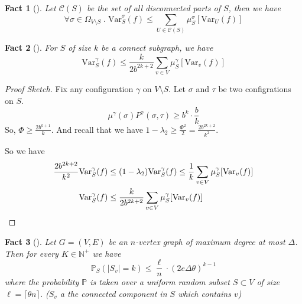 \documentclass{article}
\newtheorem{fact}{Fact}[section]
\def\Var{\mathrm{Var}}
\begin{document}
\begin{fact}[\cite{CLV20-1}]
  Let $\mathcal{C}(S)$ be the set of all disconnected parts of $S$, then we have
  \[\forall \sigma\in \Omega_{V\setminus S} \;.\; \Var_S^\sigma (f) \leq \sum_{U\in\mathcal{C}(S)} \mu^\sigma_S[\Var_U(f)]\]
\end{fact}

\begin{fact}[\cite{CLV20-1}]
  For $S$ of size $k$ be a connect subgraph, we have
  \[\Var^\gamma_S(f) \leq \frac{k}{2b^{2k+2}}\sum_{v\in V} \mu^\gamma_S[\Var_v(f)]\]
\end{fact}
\begin{proof}[Proof Sketch]
  Fix any configuration $\gamma$ on $V\setminus S$.
  Let $\sigma$ and $\tau$ be two configrations on $S$.
  \[\mu^\gamma(\sigma)P^\gamma(\sigma, \tau) \geq b^k\cdot\frac{b}{k}\]
  So, $\Phi \geq \frac{2b^{k+1}}{k}$.
  And recall that we have $1 - \lambda_2 \geq \frac{\Phi^2}{2} = \frac{2b^{2k+2}}{k^2}$.

  So we have 
  \begin{align*}
    \frac{2b^{2k+2}}{k^2}\Var_S^\gamma (f) &\leq (1 - \lambda_2)\Var_S^\gamma(f) \leq \frac{1}{k} \sum_{v\in V} \mu^\gamma_S[\Var_v(f)] \\
    \Var^\gamma_S(f) &\leq \frac{k}{2b^{2k+2}}\sum_{v\in V} \mu^\gamma_S[\Var_v(f)] \qedhere
  \end{align*}
\end{proof}

\begin{fact}[\cite{CLV20-1}]
  Let $G = (V, E)$ be an $n$-vertex graph of maximum degree at most $\Delta$.
  Then for every $K\in \mathbb{N}^+$ we have
  \[\mathbb{P}_S(|S_v| = k) \leq \frac{\ell}{n} \cdot (2e\Delta\theta)^{k-1}\]
  where the probability $\mathbb{P}$ is taken over a uniform random subset $S\subset V$ of size $\ell = \lceil\theta n\rceil$. ($S_v$ a the connected component in $S$ which contains $v$)
\end{fact}
\end{document}
